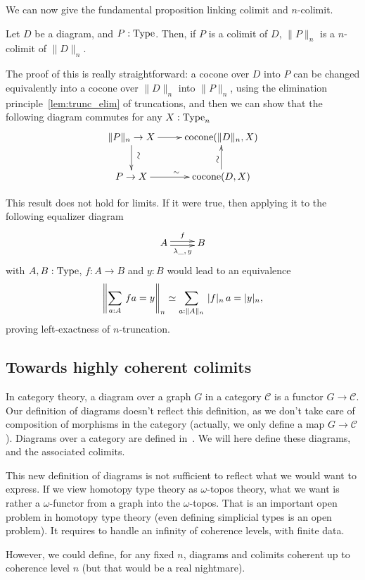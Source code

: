 We can now give the fundamental proposition linking colimit and
$n$-colimit.

\begin{prop}
  Let $D$ be a diagram, and $P:\operatorname{Type}$.
  Then, if $P$ is a colimit of $D$, $\|P\|_n$ is a $n$-colimit of $\|D\|_n$.
\end{prop}

The proof of this is really straightforward: a cocone over $D$ into
$P$ can be changed equivalently into a cocone over $\|D\|_n$ into $\|P\|_n$, using the
elimination principle~\ref{lem:trunc_elim} of truncations, and then
we can show that the following diagram commutes for any $X:\operatorname{Type}_n$
\[
  \xymatrix{
    \|P\|_n \to X \ar[r] \ar[d]^*[@]{\hbox to 0pt{\hss$\sim$\hss}} & \mathrm{cocone}(\|D\|_n,X) \\
    P \to X \ar[r]^\sim& \mathrm{cocone}(D,X) \ar[u]^*[@]{\hbox to 0pt{\hss$\sim$\hss}}
  }
\]

\begin{rmq}
This result does not hold for limits. If it were
true, then applying it to the following equalizer diagram
\[ \xymatrix{ A \ar@<-.5ex>[r]_{\lambda \_,\,y} \ar@<.5ex>[r]^f & B }\]
with $A,B:\operatorname{Type}$, $f:A\to B$ and $y:B$ would lead to an equivalence
\[ \left\| \sum_{a:A}\, f a = y \right\|_{n} \simeq \sum_{a:\|A\|_{n}}\, |f|_{n}\, a = |y|_{n}, \]
proving left-exactness of $n$-truncation.  
\end{rmq}

\subsection{Towards highly coherent colimits}
\label{ssec:high_colimit}

In category theory, a diagram over a graph $G$ in a category $\mathcal
C$ is a functor $G \to \mathcal C$. Our definition of diagrams doesn't
reflect this definition, as we don't take care of composition of
morphisms in the category (actually, we only define a map
$G\to\mathcal C$). Diagrams over a category are defined
in~\cite[Exercise 7.16]{hottbook}. We will here define these diagrams,
and the associated colimits.

\begin{rmq}
  This new definition of diagrams is not sufficient to reflect what we
  would want to express. If we view homotopy type theory as
  $\omega$-topos theory, what we want is rather a $\omega$-functor
  from a graph into the $\omega$-topos. That is an important open
  problem in homotopy type theory (even defining simplicial types is
  an open problem). It requires to handle an infinity of coherence
  levels, with finite data. 

  However, we could define, for any fixed $n$, diagrams and colimits
  coherent up to coherence level $n$ (but that would be a real nightmare).
\end{rmq}

